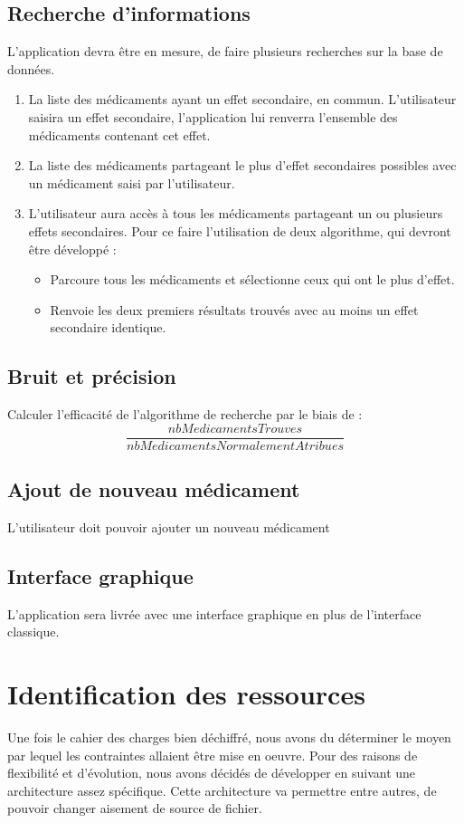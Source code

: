 \documentclass[12pt,a4paper]{report}
\begin{document}
\subsection*{Recherche d'informations}
L'application devra être en mesure, de faire plusieurs recherches sur la base de données. 
\begin{enumerate}
	\item La liste des médicaments ayant un effet secondaire, en commun. L'utilisateur saisira un effet secondaire, l'application lui renverra l'ensemble des médicaments contenant cet effet. 
	\item La liste des médicaments partageant le plus d'effet secondaires possibles avec un médicament saisi par l'utilisateur. 
	\item L'utilisateur aura accès à tous les médicaments partageant un ou plusieurs effets secondaires. Pour ce faire l'utilisation de deux algorithme, qui devront être développé : 
	\begin{itemize}
		\item Parcoure tous les médicaments et sélectionne ceux qui ont le plus d'effet. 
		\item Renvoie les deux premiers résultats trouvés avec au moins un effet secondaire identique.
	\end{itemize}
\end{enumerate}

\subsection*{Bruit et précision}
Calculer l'efficacité de l'algorithme de recherche par le biais de : 
\begin{equation}
	\frac{nbMedicamentsTrouves}{nbMedicamentsNormalementAtribues}
\end{equation}

\subsection*{Ajout de nouveau médicament}
L'utilisateur doit pouvoir ajouter un nouveau médicament
\subsection*{Interface graphique}
L'application sera livrée avec une interface graphique en plus de l'interface classique. 

\section{Identification des ressources}
Une fois le cahier des charges bien déchiffré, nous avons du déterminer le moyen par lequel les contraintes allaient être mise en oeuvre. 
Pour des raisons de flexibilité et d'évolution, nous avons décidés de développer en suivant une architecture assez spécifique. 
Cette architecture va permettre entre autres, de pouvoir changer aisement de source de fichier. 
\end{document}
